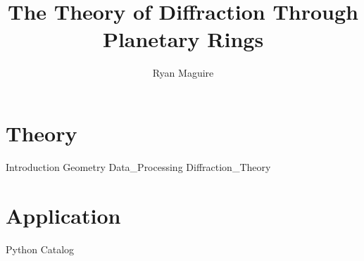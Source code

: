 \documentclass[crop=false,class=book,oneside]{standalone}
\begin{document}
    \newif\ifplanetdiff
    \ifstandalone
        \title{The Theory of Diffraction Through Planetary Rings}
        \author{Ryan Maguire}
        \date{\vspace{-5ex}}
        \maketitle
        \tableofcontents
        \listoffigures
        \listoftables
        \clearpage
    \fi
    \part{Theory}
        {Introduction}
        {Geometry}
        {Data_Processing}
        {Diffraction_Theory}
    \part{Application}
        {Python}
        {Catalog}
\end{document}
